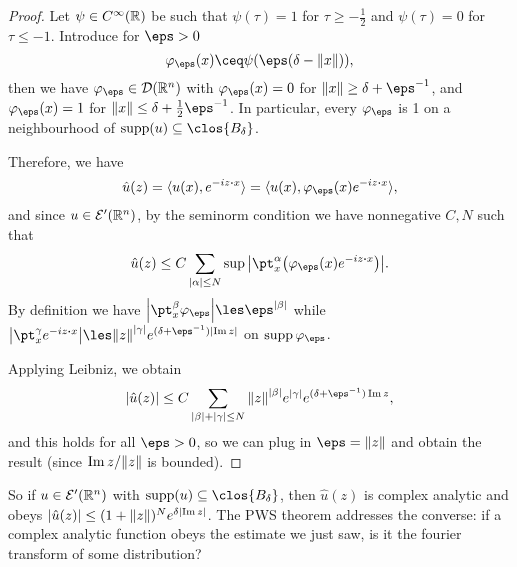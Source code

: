 \begin{proof}
	Let $\psi \in C^\infty(\mathbb R)$ be such that $\psi(\tau) = 1$ for $\tau \geq -\frac12$ and $\psi(\tau) = 0$ for $\tau \leq -1$.  Introduce for $\eps > 0$
	\[
	\phi_\eps(x) \ceq \psi(\eps(\delta - \norm{x})),
	\]
	then we have $\phi_\eps \in \DD(\RR^n)$ with $\phi_\eps(x) = 0$ for $\norm{x}\geq \delta + \eps^{-1}$, and $\phi_\eps(x) = 1$ for $\norm{x} \leq \delta + \frac12\eps^{-1}$. In particular, every $\phi_\eps$ is 1 on a neighbourhood of $\supp(u) \subseteq \clos{B_\delta}$. 
	
	Therefore, we have
	\[
	\hat u(z) = \ang{u(x), e^{-iz\vdot x}} = \ang{u(x), \phi_\eps(x) e^{-iz\vdot x}},
	\]
	and since $u \in \mathcal E'(\mathbb R^n)$, by the seminorm condition we have nonnegative $C, N$ such that
	\[
	\hat u(z) \leq C \sum_{\abs{\alpha} \leq N} \sup \abs{\pt^\alpha_x \qty(\phi_\eps(x) e^{-iz \vdot x})}.
	\]
	By definition we have $\abs{\pt_x^\beta \phi_\eps} \les \eps^{\abs{\beta}}$ while $\abs{\pt_x^\gamma e^{-iz \vdot x}} \les \norm{z}^{\abs{\gamma}} e^{(\delta + \eps^{-1}) \abs{\Im z}}$ on $\supp\phi_\eps$. 
	
	Applying Leibniz, we obtain
	\[
	\abs{\hat u(z)} \leq C \sum_{\abs{\beta} + \abs{\gamma} \leq N} \norm{z}^{\abs{\beta}} e^{\abs{\gamma}} e^{(\delta + \eps^{-1}) \Im z}, 
	\]
	and this holds for all $\eps > 0$, so we can plug in $\eps = \norm{z}$ and obtain the result (since $\Im z / \norm{z}$ is bounded). 
\end{proof}

So if $u \in \mathcal E'(\mathbb R^n)$ with $\supp(u) \subseteq \clos{B_\delta}$, then $\hat u(z)$ is complex analytic and obeys $\abs{\hat u(z)} \leq (1 + \norm{z})^N e^{\delta \abs{\Im z}}$. The PWS theorem addresses the converse: if a complex analytic function obeys the estimate we just saw, is it the fourier transform of some distribution? 

